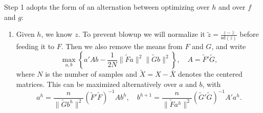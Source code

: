 \documentclass[a4paper,11pt]{article}
\theoremstyle{definition}
\begin{document}
Step 1 adopts the form of an alternation between optimizing over $h$ and over $f$ and $g$:
%
\begin{enumerate}


\item Given $h$, we know $z$. To prevent blowup we will normalize it $\tilde{z}=\frac{z-\bar{z}}{\text{sd}(z)}$ before feeding it to $F$. Then we also remove the means from $F$ and $G$, and write
%
$$ \max_{a,b} \left\{ a' A b - \frac{1}{2 N} \|\tilde{F} a\|^2 \|\tilde{G} b\|^2 \right\} , \quad A = \tilde{F}' \tilde{G}, $$
%
where $N$ is the number of samples and $\tilde{X}=X-\bar{X}$ denotes the centered matrices. This can be maximized alternatively over $a$ and $b$, with
%
$$ a^{h} = \frac{n}{\|\tilde{G} b^h\|^2} (\tilde{F}' \tilde{F})^{-1} A b^h, \quad b^{h+1} = \frac{n}{\|\tilde{F} a^{h}\|^2} (\tilde{G}' \tilde{G})^{-1} A'a^{h}. $$





\end{enumerate}
\end{document}
